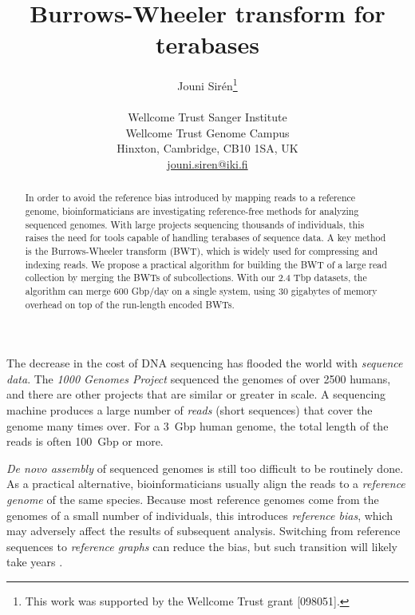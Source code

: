 \documentclass[smallabstract,smallcaptions]{dccpaper}
\begin{document}
\title
{\vspace{-12pt}\large
\textbf{Burrows-Wheeler transform for terabases}
}


\author{%
Jouni Sirén\thanks{This work was supported by the Wellcome Trust grant [098051].} \\[0.5em]
{\small\begin{minipage}{\linewidth}\begin{center}
\begin{tabular}{c}
Wellcome Trust Sanger Institute \\
Wellcome Trust Genome Campus \\
Hinxton, Cambridge, CB10 1SA, UK \\
\url{jouni.siren@iki.fi}
\end{tabular}
\end{center}\end{minipage}}
}


\maketitle
\thispagestyle{empty}


\begin{abstract}
In order to avoid the reference bias introduced by mapping reads to a reference genome, bioinformaticians are investigating reference-free methods for analyzing sequenced genomes. With large projects sequencing thousands of individuals, this raises the need for tools capable of handling terabases of sequence data. A key method is the Burrows-Wheeler transform (BWT), which is widely used for compressing and indexing reads. We propose a practical algorithm for building the BWT of a large read collection by merging the BWTs of subcollections. With our 2.4 Tbp datasets, the algorithm can merge 600 Gbp/day on a single system, using 30 gigabytes of memory overhead on top of the run-length encoded BWTs.
\end{abstract}



The decrease in the cost of DNA sequencing has flooded the world with \emph{sequence data}. The \emph{1000 Genomes Project} \cite{1000GP2015} sequenced the genomes of over 2500 humans, and there are other projects that are similar or greater in scale. A sequencing machine produces a large number of \emph{reads} (short sequences) that cover the genome many times over. For a 3~Gbp human genome, the total length of the reads is often 100~Gbp or more.

\emph{De novo assembly} of sequenced genomes is still too difficult to be routinely done. As a practical alternative, bioinformaticians usually align the reads to a \emph{reference genome} of the same species. Because most reference genomes come from the genomes of a small number of individuals, this introduces \emph{reference bias}, which may adversely affect the results of subsequent analysis. Switching from reference sequences to \emph{reference graphs} can reduce the bias, but such transition will likely take years \cite{Church2015}.
\end{document}
